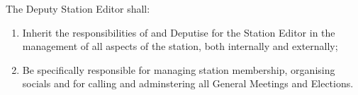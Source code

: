 \item The Deputy Station Editor shall:
\begin{enumerate}[label*=\arabic*.]
    \item Inherit the responsibilities of and Deputise for the Station Editor in the management of all aspects of the station, both internally and externally;
    \item Be specifically responsible for managing station membership, organising socials and for calling and adminstering all General Meetings and Elections.
\end{enumerate}
